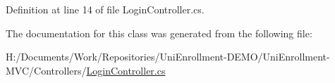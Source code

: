 Definition at line 14 of file Login\+Controller.\+cs.



The documentation for this class was generated from the following file\+:\begin{DoxyCompactItemize}
\item 
H\+:/\+Documents/\+Work/\+Repositories/\+Uni\+Enrollment-\/\+D\+E\+M\+O/\+Uni\+Enrollment-\/\+M\+V\+C/\+Controllers/\hyperlink{_login_controller_8cs}{Login\+Controller.\+cs}\end{DoxyCompactItemize}
